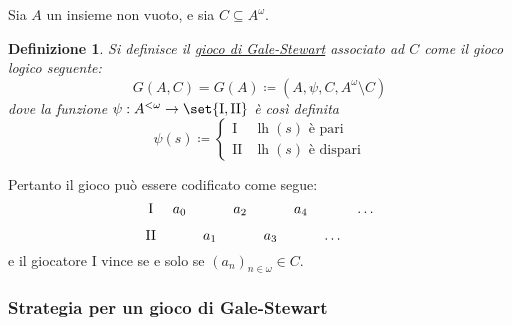 \documentclass[titlepage]{article}
\newcommand{\1}{\mathds{1}}
\theoremstyle{definition}%
\theoremstyle{plain}
\newtheorem{defn}[thm]{Definizione}
\theoremstyle{remark}
\begin{document}
Sia \(A\) un {insieme} non vuoto, e sia \(C \subseteq A^{\omega}\).

\begin{defn}
Si definisce il \uline{gioco di Gale-Stewart} associato ad \(C\) come il {gioco logico} seguente:
\begin{equation*}
G(A,C) = G(A) \coloneqq (A, \psi, C, A^{\omega}\setminus C)
\end{equation*}
dove la {funzione} \(\psi: A^{<\omega}\to \set{\text{I},\text{II}}\) è così definita
\begin{equation*}
\psi(s) \coloneqq \begin{cases}
\text{I} & \operatorname{lh}(s)\text{ è pari}\\
\text{II} & \operatorname{lh}(s)\text{ è dispari}
\end{cases}
\end{equation*}
\end{defn}

Pertanto il gioco può essere codificato come segue:
\begin{equation*}
\begin{tikzcd}[ampersand replacement=\&,cramped,sep=tiny]
	{\text{I}} \& {a_0} \&\& {a_2} \&\& {a_4} \&\& \dots \\
	{\text{II}} \&\& {a_1} \&\& {a_3} \&\& \dots
\end{tikzcd}
\end{equation*}
e il giocatore I vince se e solo se \((a_{n})_{n \in \omega} \in C\).

\subsubsection{Strategia per un gioco di Gale-Stewart}
\label{sec:org1db90c5}
\end{document}
